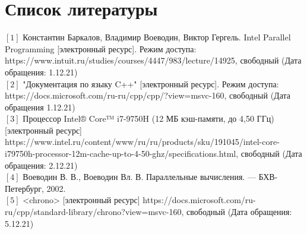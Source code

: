 %
\chapter{Список литературы}
\noindent$[1]$  Константин Баркалов, Владимир Воеводин, Виктор Гергель. Intel Parallel Programming [электронный ресурс]. Режим доступа: https://www.intuit.ru/studies/courses/4447/983/lecture/14925, свободный (Дата обращения: 1.12.21)\\
$[2]$ "Документация по языку C++" [электронный ресурс]. Режим доступа: https://docs.microsoft.com/ru-ru/cpp/cpp/?view=msvc-160, свободный (Дата обращения 1.12.21)\\
$[3]$ Процессор Intel® Core™ i7-9750H (12 МБ кэш-памяти, до 4,50 ГГц) [электронный ресурс] https://www.intel.ru/content/www/ru/ru/products/sku/191045/intel-core-i79750h-processor-12m-cache-up-to-4-50-ghz/specifications.html, свободный (Дата обращения: 2.12.21)\\
$[4]$ Воеводин В. В., Воеводин Вл. В. Параллельные вычисления. — БХВ-Петербург, 2002. \\
$[5]$ <chrono> [электронный ресурс] https://docs.microsoft.com/ru-ru/cpp/standard-library/chrono?view=msvc-160, свободный (Дата обращения: 5.12.21)\\